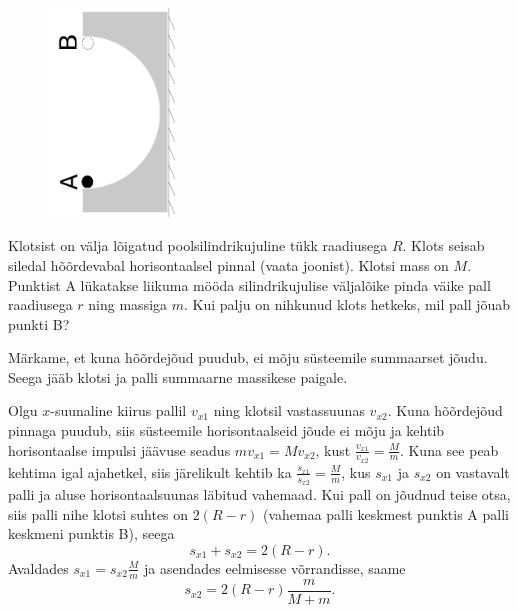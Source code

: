 
\begin{figure}
	\vspace{-15pt}
	\includegraphics[angle=-90,origin=c,width=0.3\textwidth]{2016-v2g-08-halfpipe.pdf}
\end{figure}
Klotsist on välja lõigatud poolsilindrikujuline tükk raadiusega $R$. Klots seisab siledal hõõrdevabal horisontaalsel pinnal (vaata joonist). Klotsi mass on $M$. Punktist A lükatakse liikuma mööda silindrikujulise väljalõike pinda väike pall raadiusega $r$ ning massiga $m$. Kui palju on nihkunud klots hetkeks, mil pall jõuab punkti B?

\hint
Märkame, et kuna hõõrdejõud puudub, ei mõju süsteemile summaarset jõudu. Seega jääb klotsi ja palli summaarne massikese paigale.

\solu
Olgu $x$-suunaline kiirus pallil $v_{x1}$ ning klotsil vastassuunas $v_{x2}$. Kuna hõõrdejõud pinnaga puudub, siis süsteemile horisontaalseid jõude ei mõju ja kehtib horisontaalse impulsi jäävuse seadus $mv_{x1}=Mv_{x2}$, kust $\frac{v_{x1}}{v_{x2}}=\frac{M}{m}$. Kuna see peab kehtima igal ajahetkel, siis järelikult kehtib ka $\frac{s_{x1}}{s_{x2}}=\frac{M}{m}$, kus $s_{x1}$ ja $s_{x2}$ on vastavalt palli ja aluse horisontaalsuunas läbitud vahemaad. Kui pall on jõudnud teise otsa, siis palli nihe klotsi suhtes on $2(R-r)$ (vahemaa palli keskmest punktis A palli keskmeni punktis B), seega
\[
s_{x1}+s_{x2}=2(R-r).
\]
Avaldades $s_{x1} = s_{x2}\frac Mm$ ja asendades eelmisesse võrrandisse, saame 
$$s_{x2}=2(R-r)\frac{m}{M+m}.$$

